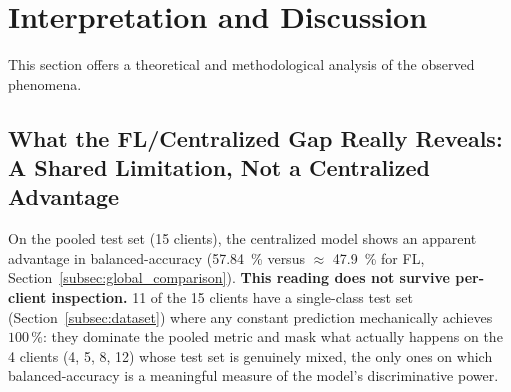 \documentclass{article}
\begin{document}
\section{Interpretation and Discussion}
\label{sec:discussion}

This section offers a theoretical and methodological analysis of the observed
phenomena.

\subsection{What the FL/Centralized Gap Really Reveals: A Shared Limitation, Not
a Centralized Advantage}
\label{subsec:why_cent_wins}

On the pooled test set (15 clients), the centralized model shows an apparent
advantage in balanced-accuracy (57.84~\% versus $\approx$ 47.9~\% for FL,
Section~\ref{subsec:global_comparison}). \textbf{This reading does not survive
per-client inspection.} 11 of the 15 clients have a single-class test set
(Section~\ref{subsec:dataset}) where any constant prediction mechanically
achieves $100\,\%$: they dominate the pooled metric and mask what actually
happens on the 4 clients (4, 5, 8, 12) whose test set is genuinely mixed, the
only ones on which balanced-accuracy is a meaningful measure of the model's
discriminative power.
\end{document}
